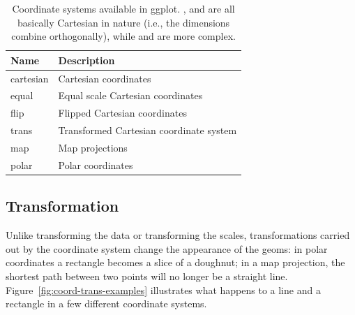\begin{table}
  \begin{center}
  \begin{tabular}{ll}
    \toprule
    Name      & Description  \\
    \midrule
    cartesian & Cartesian coordinates                  \\
    equal     & Equal scale Cartesian coordinates      \\
    flip      & Flipped Cartesian coordinates          \\
    trans     & Transformed Cartesian coordinate system\\[1em]
    map       & Map projections                        \\
    polar     & Polar coordinates                      \\
    \bottomrule
    
  \end{tabular}
  \end{center}
  \caption{Coordinate systems available in ggplot.  ,  and  are all basically Cartesian in nature (i.e., the dimensions combine orthogonally), while  and  are more complex.}
  \label{tbl:coord}
\end{table}

\subsection{Transformation}
\label{sub:coord-transformation}

Unlike transforming the data or transforming the scales, transformations carried out by the coordinate system change the appearance of the geoms: in polar coordinates a rectangle becomes a slice of a doughnut; in a map projection, the shortest path between two points will no longer be a straight line.  Figure~\ref{fig:coord-trans-examples} illustrates what happens to a line and a rectangle in a few different coordinate systems.

% 


